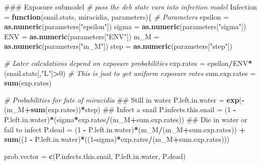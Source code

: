 \documentclass[10,portrait]{article}
\newenvironment{Shaded}{\begin{snugshade}}{\end{snugshade}}
\newcommand{\KeywordTok}[1]{\textcolor[rgb]{0.13,0.29,0.53}{\textbf{#1}}}
\newcommand{\DecValTok}[1]{\textcolor[rgb]{0.00,0.00,0.81}{#1}}
\newcommand{\StringTok}[1]{\textcolor[rgb]{0.31,0.60,0.02}{#1}}
\newcommand{\CommentTok}[1]{\textcolor[rgb]{0.56,0.35,0.01}{\textit{#1}}}
\newcommand{\ControlFlowTok}[1]{\textcolor[rgb]{0.13,0.29,0.53}{\textbf{#1}}}
\newcommand{\OperatorTok}[1]{\textcolor[rgb]{0.81,0.36,0.00}{\textbf{#1}}}
\newcommand{\NormalTok}[1]{#1}
\begin{document}
\begin{Shaded}
\begin{Highlighting}[]
{{\NormalTok{### Exposure submodel}
\CommentTok{# pass the deb state vars into infection model }
\NormalTok{Infection =}\StringTok{ }\ControlFlowTok{function}\NormalTok{(snail.stats, miracidia, parameters)\{}
  \CommentTok{# Parameters}
\NormalTok{  epsilon =}\StringTok{ }\KeywordTok{as.numeric}\NormalTok{(parameters[}\StringTok{"epsilon"}\NormalTok{])}
\NormalTok{  sigma =}\StringTok{ }\KeywordTok{as.numeric}\NormalTok{(parameters[}\StringTok{"sigma"}\NormalTok{])}
\NormalTok{  ENV =}\StringTok{ }\KeywordTok{as.numeric}\NormalTok{(parameters[}\StringTok{"ENV"}\NormalTok{])}
\NormalTok{  m_M =}\StringTok{ }\KeywordTok{as.numeric}\NormalTok{(parameters[}\StringTok{"m_M"}\NormalTok{])}
\NormalTok{  step =}\StringTok{ }\KeywordTok{as.numeric}\NormalTok{(parameters[}\StringTok{"step"}\NormalTok{])}
  
  \CommentTok{# Later calculations depend on exposure probabilities}
\NormalTok{  exp.rates =}\StringTok{ }\NormalTok{epsilon}\OperatorTok{/}\NormalTok{ENV}\OperatorTok{*}\NormalTok{(snail.stats[,}\StringTok{"L"}\NormalTok{]}\OperatorTok{>}\DecValTok{0}\NormalTok{) }\CommentTok{# This is just to get uniform exposure rates}
\NormalTok{  sum.exp.rates =}\StringTok{ }\KeywordTok{sum}\NormalTok{(exp.rates)}
  
  \CommentTok{# Probabilities for fate of miracidia}
\NormalTok{  ## Still in water}
\NormalTok{  P.left.in.water =}\StringTok{ }\KeywordTok{exp}\NormalTok{(}\OperatorTok{-}\NormalTok{(m_M}\OperatorTok{+}\KeywordTok{sum}\NormalTok{(exp.rates))}\OperatorTok{*}\NormalTok{step)}
\NormalTok{  ## Infect a snail}
\NormalTok{  P.infects.this.snail =}\StringTok{ }\NormalTok{(}\DecValTok{1} \OperatorTok{-}\StringTok{ }\NormalTok{P.left.in.water)}\OperatorTok{*}\NormalTok{(sigma}\OperatorTok{*}\NormalTok{exp.rates}\OperatorTok{/}\NormalTok{(m_M}\OperatorTok{+}\NormalTok{sum.exp.rates)) }
\NormalTok{  ## Die in water or fail to infect}
\NormalTok{  P.dead =}\StringTok{ }\NormalTok{(}\DecValTok{1} \OperatorTok{-}\StringTok{ }\NormalTok{P.left.in.water)}\OperatorTok{*}\NormalTok{(m_M}\OperatorTok{/}\NormalTok{(m_M}\OperatorTok{+}\NormalTok{sum.exp.rates)) }\OperatorTok{+}\StringTok{ }\KeywordTok{sum}\NormalTok{((}\DecValTok{1} \OperatorTok{-}\StringTok{ }\NormalTok{P.left.in.water)}\OperatorTok{*}\NormalTok{((}\DecValTok{1}\OperatorTok{-}\NormalTok{sigma)}\OperatorTok{*}\NormalTok{exp.rates}\OperatorTok{/}\NormalTok{(m_M}\OperatorTok{+}\NormalTok{sum.exp.rates)))}
  
\NormalTok{  prob.vector =}\StringTok{ }\KeywordTok{c}\NormalTok{(P.infects.this.snail, P.left.in.water, P.dead)}
  
}}
\end{Highlighting}
\end{Shaded}
\end{document}
